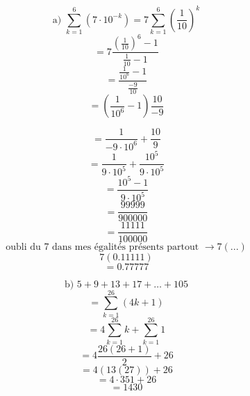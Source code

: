 \documentclass{article}
\begin{document}
\[ \text{a) } \sum_{k=1}^{6} (7 \cdot 10^{-k}) = 7 \sum_{k=1}^{6} (\frac{1}{10})^k \]
\[ = 7 \frac{(\frac{1}{10})^6 - 1}{\frac{1}{10} - 1} \]
\[ = \frac{\frac{1}{10^6} - 1}{\frac{-9}{10}} \]
\[ = (\frac{1}{10^6} - 1) \frac{10}{-9} \]

\[ = \frac{1}{-9 \cdot 10^6} + \frac{10}{9} \]
\[ = \frac{1}{9 \cdot 10^5} + \frac{10^5}{9 \cdot 10^5} \]
\[ = \frac{10^5 - 1}{9 \cdot 10^5}\]
\[ = \frac{99999}{900000}\]
\[ = \frac{11111}{100000}\]
\[ \text{oubli du 7 dans mes égalités présents partout } \rightarrow 7(...) \]
\[ 7(0.11111) \]
\[ = 0.77777 \]

\[ \text{b) } 5 + 9 + 13 + 17 + \dots + 105 \]
\[ = \sum_{k=1}^{26} (4k+1) \]
\[ = 4 \sum_{k=1}^{26} k + \sum_{k=1}^{26} 1 \]
\[ = 4 \frac{26(26+1)}{2} + 26 \]
\[ = 4 (13(27)) + 26 \]
\[ = 4 \cdot 351 + 26 \]
\[ = 1430 \]
\end{document}
